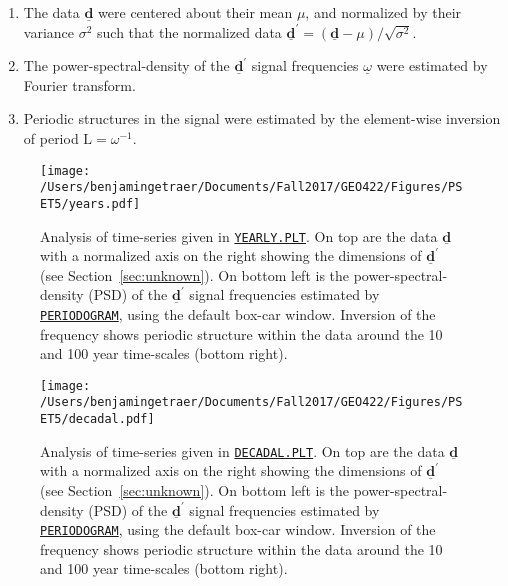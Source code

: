\documentclass[11pt]{article}
\begin{document}
\begin{enumerate}
\item The data $\underline{\textbf{d}}$ were centered about their mean $\mu$, and normalized by their variance $\sigma^2$ such that the normalized data $\underline{\textbf{d}}^{\prime}=(\underline{\textbf{d}}-\mu)/ \sqrt{\sigma^2}$.
\item The power-spectral-density of the $\underline{\textbf{d}}^{\prime}$ signal frequencies $\underline{\omega}$ were estimated by Fourier transform.
\item Periodic structures in the signal were estimated by the element-wise inversion of period $\mathrm{L}={\omega}^{-1}$.
\end{enumerate}


\begin{figure}[h!]
\centering
\texttt{[image: /Users/benjamingetraer/Documents/Fall2017/GEO422/Figures/PSET5/years.pdf]}
\caption{Analysis of time-series given in \href{http://geoweb.princeton.edu/people/simons/YEARLY.PLT}{\texttt{YEARLY.PLT}}. On top are the data $\underline{\textbf{d}}$ with a normalized axis on the right showing the dimensions of $\underline{\textbf{d}}^{\prime}$ (see Section~\ref{sec:unknown}). On bottom left is the power-spectral-density (PSD) of the $\underline{\textbf{d}}^{\prime}$ signal frequencies estimated by \href{https://www.mathworks.com/help/signal/ref/periodogram.html}{\texttt{PERIODOGRAM}}, using the default box-car window. Inversion of the frequency shows periodic structure within the data around the 10 and 100 year time-scales (bottom right).}
\label{fig:yearly}
\end{figure}

\begin{figure}[h!]
\centering
\texttt{[image: /Users/benjamingetraer/Documents/Fall2017/GEO422/Figures/PSET5/decadal.pdf]}
\caption{Analysis of time-series given in \href{http://geoweb.princeton.edu/people/simons/DECADAL.PLT}{\texttt{DECADAL.PLT}}. On top are the data $\underline{\textbf{d}}$ with a normalized axis on the right showing the dimensions of $\underline{\textbf{d}}^{\prime}$ (see Section~\ref{sec:unknown}). On bottom left is the power-spectral-density (PSD) of the $\underline{\textbf{d}}^{\prime}$ signal frequencies estimated by \href{https://www.mathworks.com/help/signal/ref/periodogram.html}{\texttt{PERIODOGRAM}}, using the default box-car window. Inversion of the frequency shows periodic structure within the data around the 10 and 100 year time-scales (bottom right).}
\label{fig:decadal}
\end{figure}
\end{document}
